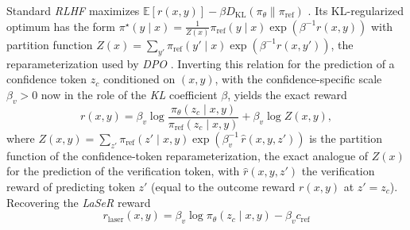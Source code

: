 \documentclass[a4paper,oneside,10pt,english]{scrbook}
\DeclareRobustCommand{\acfit}[1]{\textit{\ac{#1}}}
\begin{document}
Standard \acfit{RLHF} maximizes $\mathbb{E}\![r(x,y)] - \beta D_{\mathrm{KL}}(\pi_\theta\|\pi_{\mathrm{ref}})$ \citep{drlhumanpreferences,rlhf}. Its KL-regularized optimum has the form $\pi^\star(y\mid x) = \frac{1}{Z(x)}\pi_{\mathrm{ref}}(y\mid x)\exp(\beta^{-1}r(x,y))$ with partition function $Z(x) = \sum_{y'}\pi_{\mathrm{ref}}(y'\mid x)\exp(\beta^{-1}r(x,y'))$, the reparameterization used by \acfit{DPO} \citep{directpreferenceopt}. Inverting this relation for the prediction of a confidence token $z_c$ conditioned on $(x,y)$, with the confidence-specific scale $\beta_v > 0$ now in the role of the \acfit{KL} coefficient $\beta$, yields the exact reward
\begin{equation}
	r(x,y) = \beta_v \log\frac{\pi_\theta(z_c\mid x, y)}{\pi_{\mathrm{ref}}(z_c\mid x, y)} + \beta_v \log Z(x,y),
\end{equation}
where $Z(x,y) = \sum_{z'}\pi_{\mathrm{ref}}(z'\mid x,y)\exp(\beta_v^{-1}\, \hat r(x,y,z'))$ is the partition function of the confidence-token reparameterization, the exact analogue of $Z(x)$ for the prediction of the verification token, with $\hat r(x,y,z')$ the verification reward of predicting token $z'$ (equal to the outcome reward $r(x,y)$ at $z' = z_c$). Recovering the \acfit{LaSeR} reward \citep{laser}
\begin{equation}
	r_{\mathrm{laser}}(x,y) = \beta_v \log \pi_\theta(z_c\mid x, y) - \beta_v c_{\mathrm{ref}}
\end{equation}
\end{document}
